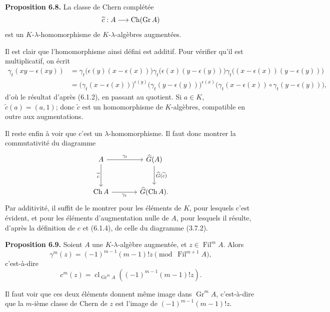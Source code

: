 \documentclass[11pt]{article}
\newcommand{\Gr}{\operatorname{Gr}}
\newcommand{\Fil}{\operatorname{Fil}}
\newcommand{\cl}{\operatorname{cl}}
\providecommand{\Gr}{\operatorname{Gr}}
\providecommand{\Gr}{\operatorname{G}}
\begin{document}
\textbf{Proposition 6.8.} La classe de Chern complétée
\[
  \widetilde c:A\longrightarrow\Ch(\Gr A)
\]
est un \(K\)-\(\lambda\)-homomorphisme de \(K\)-\(\lambda\)-algèbres augmentées.

Il est clair que l'homomorphisme ainsi défini est additif. Pour vérifier qu'il est multiplicatif, on écrit
\[
\begin{aligned}
\gamma_t(xy-\epsilon(xy))
&=\gamma_t\bigl(\epsilon(y)(x-\epsilon(x))\bigr)
  \gamma_t\bigl(\epsilon(x)(y-\epsilon(y))\bigr)
  \gamma_t\bigl((x-\epsilon(x))(y-\epsilon(y))\bigr)\\
&=\bigl(\gamma_t(x-\epsilon(x))\bigr)^{\epsilon(y)}
  \bigl(\gamma_t(y-\epsilon(y))\bigr)^{\epsilon(x)}
  \bigl(\gamma_t(x-\epsilon(x))\circ\gamma_t(y-\epsilon(y))\bigr),
\end{aligned}
\]
d'où le résultat d'après (6.1.2), en passant au quotient. Si \(a\in K\), \(\widetilde c(a)=(a,1)\); donc \(\widetilde c\) est un homomorphisme de \(K\)-algèbres, compatible en outre aux augmentations.

Il reste enfin à voir que c'est un \(\lambda\)-homomorphisme. Il faut donc montrer la commutativité du diagramme
\[
\begin{tikzcd}[column sep=large,row sep=large]
A \arrow[r,"\gamma_t"] \arrow[d,"\widetilde c"'] &
\Ghat(A) \arrow[d,"\Ghat(\widetilde c)"]\\
\Ch A \arrow[r,"\gamma_t"'] &
\Ghat(\Ch A).
\end{tikzcd}
\]
Par additivité, il suffit de le montrer pour les éléments de \(K\), pour lesquels c'est évident, et pour les éléments d'augmentation nulle de \(A\), pour lesquels il résulte, d'après la définition de \(c\) et (6.1.4), de celle du diagramme (3.7.2).

\textbf{Proposition 6.9.} Soient \(A\) une \(K\)-\(\lambda\)-algèbre augmentée, et \(z\in\Fil^mA\). Alors
\[
  \gamma^m(z)=(-1)^{m-1}(m-1)!z\pmod{\Fil^{m+1}A},
\]
c'est-à-dire
\[
  c^m(z)=\cl_{\Gr^mA}\!\left((-1)^{m-1}(m-1)!z\right).
\]

Il faut voir que ces deux éléments donnent même image dans \(\Gr^mA\), c'est-à-dire que la \(m\)-ième classe de Chern de \(z\) est l'image de \((-1)^{m-1}(m-1)!z\).
\end{document}
